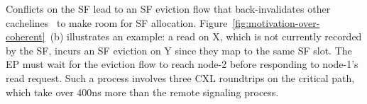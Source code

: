 




Conflicts on the SF lead to an SF eviction flow that back-invalidates other cachelines~\cite{cxl-doc, cxl-shortdoc} to make room for SF allocation. Figure~\ref{fig:motivation-over-coherent}~(b) illustrates an example: a read on X, which is not currently recorded by the SF, incurs an SF eviction on Y since they map to the same SF slot. The EP must wait for the eviction flow to reach node-2 before responding to node-1's read request. Such a process involves three CXL roundtrips on the critical path, which take over 400ns more than the remote signaling process.


